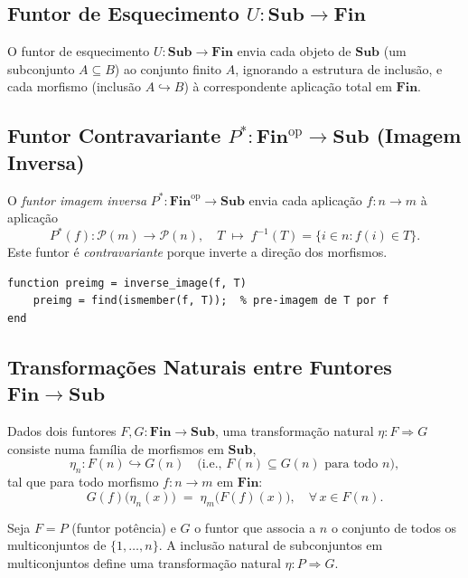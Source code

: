 \subsection{Funtor de Esquecimento $U: \mathbf{Sub} \to \mathbf{Fin}$}

O funtor de esquecimento $U: \mathbf{Sub} \to \mathbf{Fin}$ envia cada objeto de $\mathbf{Sub}$ (um subconjunto $A \subseteq B$) ao conjunto finito $A$, ignorando a estrutura de inclusão, e cada morfismo (inclusão $A \hookrightarrow B$) à correspondente aplicação total em $\mathbf{Fin}$.

\subsection{Funtor Contravariante $P^*: \mathbf{Fin}^{\mathrm{op}} \to \mathbf{Sub}$ (Imagem Inversa)}

O \emph{funtor imagem inversa} $P^*: \mathbf{Fin}^{\mathrm{op}} \to \mathbf{Sub}$ envia cada aplicação $f: n \to m$ à aplicação
\[
    P^*(f): \mathcal{P}(m) \to \mathcal{P}(n), \quad T \;\longmapsto\; f^{-1}(T) = \{i \in n : f(i) \in T\}.
\]
Este funtor é \emph{contravariante} porque inverte a direção dos morfismos.

\begin{lstlisting}[style=matlab, caption={Funtor contravariante $P^*$ (pré-imagem)}]
function preimg = inverse_image(f, T)
    preimg = find(ismember(f, T));  % pre-imagem de T por f
end
\end{lstlisting}

\subsection{Transformações Naturais entre Funtores $\mathbf{Fin} \to \mathbf{Sub}$}

Dados dois funtores $F, G: \mathbf{Fin} \to \mathbf{Sub}$, uma transformação natural $\eta: F \Rightarrow G$ consiste numa família de morfismos em $\mathbf{Sub}$,
\[
    \eta_n: F(n) \hookrightarrow G(n) \quad \text{(i.e., } F(n) \subseteq G(n) \text{ para todo } n\text{)},
\]
tal que para todo morfismo $f: n \to m$ em $\mathbf{Fin}$:
\[
    G(f)\bigl(\eta_n(x)\bigr) \;=\; \eta_m\bigl(F(f)(x)\bigr), \quad \forall\, x \in F(n).
\]

\begin{remark}
Seja $F = P$ (funtor potência) e $G$ o funtor que associa a $n$ o conjunto de todos os multiconjuntos de $\{1,\ldots,n\}$. A inclusão natural de subconjuntos em multiconjuntos define uma transformação natural $\eta: P \Rightarrow G$.
\end{remark}

